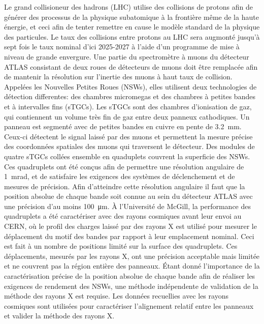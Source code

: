 Le grand collisioneur des hadrons (LHC) utilise des collisions de protons afin de g\'{e}n\'{e}rer des processus de la physique subatomique \`{a} la fronti\`{e}re m\^{e}me de la haute \'{e}nergie, et ceci afin de tenter remettre en cause le mod\`{e}le standard de la physique des particules. Le taux des collisions entre protons au LHC sera augmont\'{e} jusqu'\`{a} sept fois le taux nominal d'ici 2025-2027 \`{a} l'aide d'un programme de mise \`{a} niveau de grande envergure. Une partie du spectrom\`{e}tre \`{a} muons du d\'{e}tecteur ATLAS consistant de deux roues de d\'{e}tecteurs de muons doit \^{e}tre remplac\'{e}e afin de mantenir la r\'{e}solution sur l'inertie des muons \`{a} haut taux de collision. Appel\'{e}es les Nouvelles Petites Roues (NSWs), elles utilisent deux technologies de d\'{e}tection differentes: des chambres micromegas et des chambres \`{a} petites bandes et \`{a} intervalles fins (sTGCs). Les sTGCs sont des chambres d'ionisation de gaz, qui contiennent un volume tr\`{e}s fin de gaz entre deux panneux cathodiques. Un panneau est segment\'{e} avec de petites bandes en cuivre en pente de \SI{3.2}{mm}. Ceux-ci d\'{e}tectent le signal laiss\'{e} par des muons et permettent la mesure pr\'{e}cise des coordonn\'{e}es spatiales des muons qui traversent le d\'{e}tecteur. Des modules de quatre sTGCs coll\'{e}es ensemble en quaduplets couvrent la superficie des NSWs. Ces quadruplets ont \'{e}t\'{e} con\c{c}us afin de permettre une r\'{e}solution angulaire de \SI{1}{mrad}, et de satisfaire les exigences des syst\`{e}mes de d\'{e}clenchement et de mesures de pr\'{e}cision. Afin d'atteindre cette r\'{e}solution angulaire il faut que la position absolue de chaque bande soit connue au sein du d\'{e}tecteur ATLAS avec une pr\'{e}cision d'au moins \SI{100}{\micro\meter}. \`{A} l'Universit\'{e} de McGill, la performance des quadruplets a \'{e}t\'{e} caract\'{e}riser avec des rayons cosmiques avant leur envoi au CERN, o\`{u} le profil des charges laiss\'{e} par des rayons X est utilis\'{e} pour mesurer le d\'{e}placement du motif des bandes par rapport \`{a} leur emplacement nominal. Ceci est fait \`{a} un nombre de positions limit\'{e} sur la surface des quadruplets. Ces d\'{e}placements, mesur\'{e}s par les rayons X, ont une pr\'{e}cision acceptable mais limit\'{e}e et ne couvrent pas la r\'{e}gion enti\`{e}re des panneaux. \'{E}tant donn\'{e} l'importance de la caract\'{e}risation pr\'{e}cise de la position absolue de chaque bande afin de r\'{e}aliser les exigences de rendement des NSWs, une m\'{e}thode ind\'{e}pendente de validation de la m\'{e}thode des rayons X est requise. Les donn\'{e}es recuellies avec les rayons cosmiques sont utilis\'{e}es pour caract\'{e}riser l'alignement relatif entre les panneaux et valider la m\'{e}thode des rayons X.

